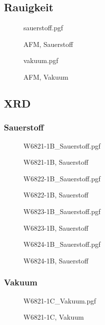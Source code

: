 \subsection{Rauigkeit}\label{subsec:rauigkeit}
\begin{figure}
    \centering
    {sauerstoff.pgf}
    \caption{AFM, Sauerstoff}
    \label{fig: AFM, Sauerstoff}
\end{figure}

\begin{figure}
    \centering
    {vakuum.pgf}
    \caption{AFM, Vakuum}
    \label{fig: AFM, Vakuum}
\end{figure}

\subsection{XRD}\label{subsec:xrd2}

\subsubsection{Sauerstoff}
\begin{figure}
    \centering
    {W6821-1B_Sauerstoff.pgf}
    \caption{W6821-1B, Sauerstoff}
    \label{fig: XRD, W6821-1B, Sauerstoff}
\end{figure}

\begin{figure}
    \centering
    {W6822-1B_Sauerstoff.pgf}
    \caption{W6822-1B, Sauerstoff}
    \label{fig: XRD, W6822-1B, Sauerstoff}
\end{figure}

\begin{figure}
    \centering
    {W6823-1B_Sauerstoff.pgf}
    \caption{W6823-1B, Sauerstoff}
    \label{fig: XRD, W6823-1B, Sauerstoff}
\end{figure}

\begin{figure}
    \centering
    {W6824-1B_Sauerstoff.pgf}
    \caption{W6824-1B, Sauerstoff}
    \label{fig: XRD, W6824-1B, Sauerstoff}
\end{figure}

\subsubsection{Vakuum}
\begin{figure}
    \centering
    {W6821-1C_Vakuum.pgf}
    \caption{W6821-1C, Vakuum}
    \label{fig: XRD, W6821-1C, Vakuum}
\end{figure}

